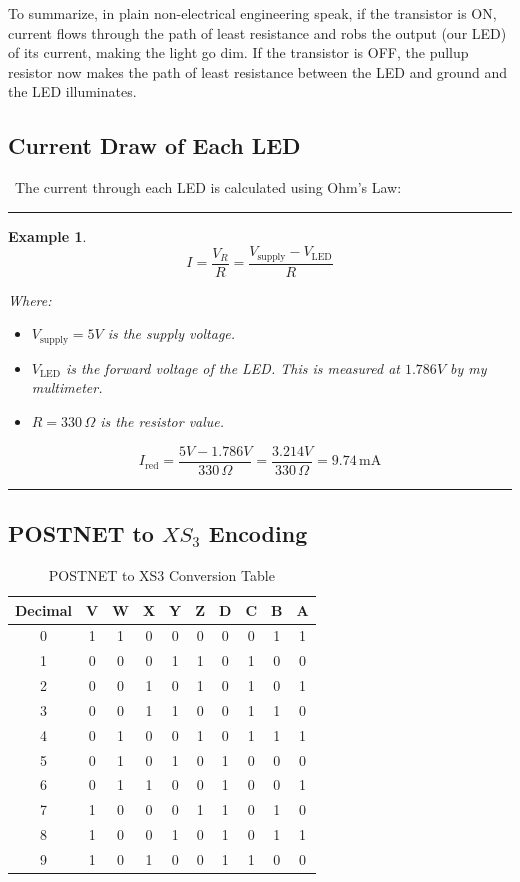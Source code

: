 \documentclass[12pt]{report}
\newtheorem{example}{Example}
\newenvironment{examp}
{\vspace{0.5cm}
\hrule
\begin{example}}
{\hrule
\vspace{0.5cm}
\end{example}}
\begin{document}
To summarize, in plain non-electrical engineering speak, if the transistor is ON, current flows through the path of least resistance and robs the output (our LED) of its current, making the light go dim. If the transistor is OFF, the pullup resistor now makes the path of least resistance between the LED and ground and the LED illuminates.
\subsection*{Current Draw of Each LED} \
The current through each LED is calculated using Ohm's Law:
\begin{examp}
	\[
		I = \frac{V_{R}}{R} = \frac{V_{\text{supply}} - V_{\text{LED}}}{R}
	\]

	Where:
	\begin{itemize}
		\item \( V_{\text{supply}} = 5V \) is the supply voltage.
		\item \( V_{\text{LED}} \) is the forward voltage of the LED.
		      This is measured at \(1.786V\) by my multimeter.
		\item \( R = 330 \, \Omega \) is the resistor value.
	\end{itemize}
	\[
		I_{\text{red}} = \frac{5V - 1.786V}{330 \, \Omega} = \frac{3.214V}{330 \, \Omega} = 9.74 \, \text{mA}
	\]
\end{examp}
\pagebreak
\subsection*{POSTNET to $XS_{3}$ Encoding}
\begin{table}[h!]
	\centering
	\begin{tabular}{|c|c c c c c|c c c c|}
		\hline
		Decimal & V & W & X & Y & Z & D & C & B & A \\
		\hline
		0       & 1 & 1 & 0 & 0 & 0 & 0 & 0 & 1 & 1 \\
		1       & 0 & 0 & 0 & 1 & 1 & 0 & 1 & 0 & 0 \\
		2       & 0 & 0 & 1 & 0 & 1 & 0 & 1 & 0 & 1 \\
		3       & 0 & 0 & 1 & 1 & 0 & 0 & 1 & 1 & 0 \\
		4       & 0 & 1 & 0 & 0 & 1 & 0 & 1 & 1 & 1 \\
		5       & 0 & 1 & 0 & 1 & 0 & 1 & 0 & 0 & 0 \\
		6       & 0 & 1 & 1 & 0 & 0 & 1 & 0 & 0 & 1 \\
		7       & 1 & 0 & 0 & 0 & 1 & 1 & 0 & 1 & 0 \\
		8       & 1 & 0 & 0 & 1 & 0 & 1 & 0 & 1 & 1 \\
		9       & 1 & 0 & 1 & 0 & 0 & 1 & 1 & 0 & 0 \\
		\hline
	\end{tabular}
	\caption{POSTNET to XS3 Conversion Table}
\end{table}
\end{document}
